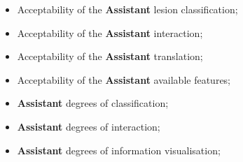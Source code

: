 
\hfill

\begin{itemize}
\item Acceptability of the \textbf{Assistant} lesion classification;
\item Acceptability of the \textbf{Assistant} interaction;
\item Acceptability of the \textbf{Assistant} translation;
\item Acceptability of the \textbf{Assistant} available features;
\item \textbf{Assistant} degrees of classification;
\item \textbf{Assistant} degrees of interaction;
\item \textbf{Assistant} degrees of information visualisation;
\end{itemize}

\hfill

